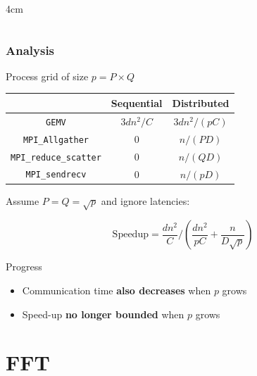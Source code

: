 \documentclass[xcolor={rgb,x11names,svgnames},rgb,x11names,svgnames]{beamer}
\begin{document}
\begin{frame}[label=2d]
\begin{columns}
\begin{column}{4cm}
  \end{column}
\end{columns}
\end{frame}



\begin{frame}[label=2d]
  \frametitle{Analysis}

  Process grid of size $p = P \times Q$
  
  \begin{center}
    \begin{tabular}{|c||c|c|}
      \hline
      & Sequential & Distributed \\
      \hline\hline
      \texttt{GEMV}                 & $3 d n^2 / C$ & $3 d n^2 / (pC)$ \\
      \hline
      \texttt{MPI\_Allgather}       & 0             & $n / (PD)$ \\
      \hline
      \texttt{MPI\_reduce\_scatter} & 0             & $n / (QD)$ \\
      \hline
      \texttt{MPI\_sendrecv}        & 0             & $n / (pD)$ \\
      \hline
    \end{tabular}
  \end{center}

  Assume $P = Q = \sqrt{p}$ and \alert{ignore latencies}:
  
  \[
    \mathrm{Speedup} = \frac{d n^2}{C} / \left(\frac{d n^2}{pC} + \frac{n}{D\sqrt{p}}\right)
  \]

  \begin{alertblock}{Progress}
    \begin{itemize}
    \item Communication time \textbf{also decreases} when $p$ grows
    \item Speed-up \textbf{no longer bounded} when $p$ grows
    \end{itemize}
  \end{alertblock}  
\end{frame}

\section{FFT}
\end{document}
